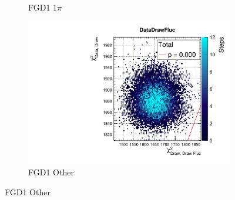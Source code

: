 \begin{figure}[h]
\begin{subfigure}[t]{0.32\textwidth}
		\caption{FGD1 1$\pi$}
	\end{subfigure}
	\begin{subfigure}[t]{0.32\textwidth}
		\includegraphics[width=\textwidth, trim={20mm 6mm 4mm 11mm}, clip,page=23]{figures/mach3/data/postpred/2017b_NewData_NewDet_UpdXsecStep_2Xsec_4Det_5Flux_0_PostPred_procs}
		\caption{FGD1 Other}
	\end{subfigure}


\end{figure}
